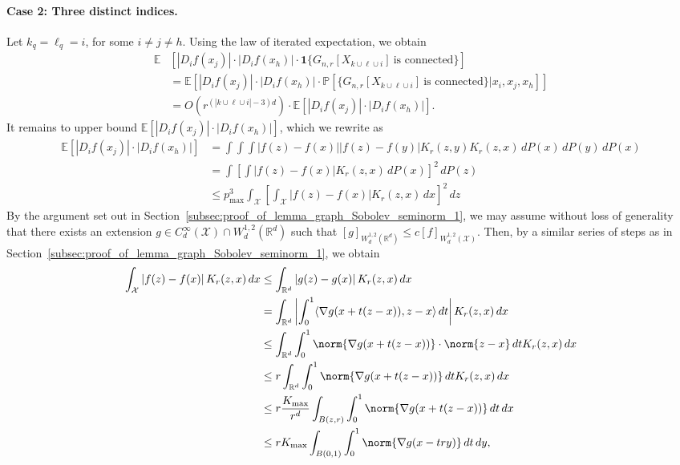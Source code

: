 \documentclass{article}
\newcommand{\Reals}{\mathbb{R}}
\newcommand{\abs}[1]{\left \lvert #1 \right \rvert}
\newcommand{\1}{\mathbf{1}}
\newcommand{\Rd}{\Reals^d}
\newcommand{\Xset}{\mathcal{X}}
\newcommand{\Pbb}{\mathbb{P}}
\newcommand{\Ebb}{\mathbb{E}}
\newcommand{\dotp}[2]{\langle #1, #2 \rangle}
\theoremstyle{alden}
\theoremstyle{aldenthm}
\theoremstyle{definition}
\theoremstyle{remark}
\begin{document}
\paragraph{Case 2: Three distinct indices.}
Let $k_q = \ell_q = i$, for some $i \neq j \neq h$. Using the law of iterated expectation, we obtain
\begin{align}
\Ebb & \left[\abs{D_{i}f(x_j)} \cdot \abs{D_if(x_h)} \cdot \1\{G_{n,r}[X_{k \cup \ell \cup i}] ~\textrm{is connected} \}\right] \\
& = \Ebb \left[\abs{D_{i}f(x_j)} \cdot \abs{D_if(x_h)} \cdot \Pbb\left[\{G_{n,r}[X_{k \cup \ell \cup i}] ~\textrm{is connected} \} |x_i,x_j,x_h\right]\right] \nonumber \\
& = O(r^{(\abs{k \cup \ell \cup i} - 3)d}) \cdot \Ebb\left[\abs{D_{i}f(x_j)} \cdot \abs{D_if(x_h)} \right]. \label{eqn:expected_difference_operators_sobolev_pf1}
\end{align}
It remains to upper bound $\Ebb\left[\abs{D_{i}f(x_j)} \cdot \abs{D_if(x_h)} \right]$, which we rewrite as
\begin{align*}
\Ebb\left[\abs{D_{i}f(x_j)} \cdot \abs{D_if(x_h)} \right] & = \int \int \int \abs{f(z) - f(x)} \abs{f(z) - f(y)} K_r(z,y) K_r(z,x) \,dP(x) \,dP(y) \,dP(x) \\
& = \int \left[\int \abs{f(z) - f(x)} K_r(z,x) \,dP(x)\right]^2 \,dP(z) \\
& \leq p_{\max}^3 \int_{\Xset} \left[\int_{\Xset} \abs{f(z) - f(x)} K_r(z,x) \,dx\right]^2 \,dz
\end{align*}
By the argument set out in Section~\ref{subsec:proof_of_lemma_graph_Sobolev_seminorm_1}, we may assume without loss of generality that there exists an extension $g \in C_d^{\infty}(\Xset) \cap W_d^{1,2}(\Rd)$ such that $[g]_{W_d^{1,2}(\Rd)} \leq c [f]_{W_d^{1,2}(\Xset)}$. Then, by a similar series of steps as in Section~\ref{subsec:proof_of_lemma_graph_Sobolev_seminorm_1}, we obtain
\begin{align*}
\int_{\Xset} \abs{f(z) - f(x)} K_r(z,x) \,dx & \leq \int_{\Rd} \abs{g(z) - g(x)} K_r(z,x) \,dx \\
& = \int_{\Rd} \abs{\int_{0}^{1} \dotp{\nabla g(x + t(z - x))}{z - x} \,dt} K_r(z,x) \,dx \\
& \leq \int_{\Rd} \int_{0}^{1} \norm{\nabla g(x + t(z - x))}\cdot\norm{z - x} \,dt K_r(z,x) \,dx \\
& \leq r \int_{\Rd} \int_{0}^{1} \norm{\nabla g(x + t(z - x))} \,dt K_r(z,x) \,dx \\
& \leq r \frac{K_{\max}}{r^d} \int_{B(z,r)} \int_{0}^{1} \norm{\nabla g(x + t(z - x))} \,dt  \,dx \\
& \leq r K_{\max} \int_{B(0,1)} \int_{0}^{1} \norm{\nabla g(x - try)} \,dt  \,dy,
\end{align*}
\end{document}
